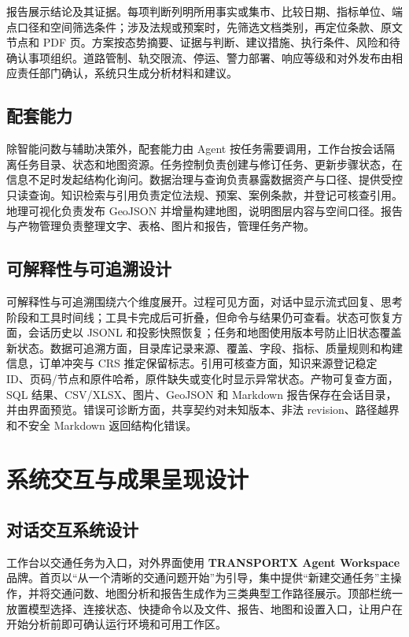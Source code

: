 \documentclass[a4paper,11pt]{article}
\newcommand{\term}[1]{\textbf{#1}}
\begin{document}
报告展示结论及其证据。每项判断列明所用事实或集市、比较日期、指标单位、端点口径和空间筛选条件；涉及法规或预案时，先筛选文档类别，再定位条款、原文节点和 PDF 页。方案按态势摘要、证据与判断、建议措施、执行条件、风险和待确认事项组织。道路管制、轨交限流、停运、警力部署、响应等级和对外发布由相应责任部门确认，系统只生成分析材料和建议。

\subsection{配套能力}

除智能问数与辅助决策外，配套能力由 Agent 按任务需要调用，工作台按会话隔离任务目录、状态和地图资源。任务控制负责创建与修订任务、更新步骤状态，在信息不足时发起结构化询问。数据治理与查询负责暴露数据资产与口径、提供受控只读查询。知识检索与引用负责定位法规、预案、案例条款，并登记可核查引用。地理可视化负责发布 GeoJSON 并增量构建地图，说明图层内容与空间口径。报告与产物管理负责整理文字、表格、图片和报告，管理任务产物。

\subsection{可解释性与可追溯设计}

可解释性与可追溯围绕六个维度展开。过程可见方面，对话中显示流式回复、思考阶段和工具时间线；工具卡完成后可折叠，但命令与结果仍可查看。状态可恢复方面，会话历史以 JSONL 和投影快照恢复；任务和地图使用版本号防止旧状态覆盖新状态。数据可追溯方面，目录库记录来源、覆盖、字段、指标、质量规则和构建信息，订单冲突与 CRS 推定保留标志。引用可核查方面，知识来源登记稳定 ID、页码/节点和原件哈希，原件缺失或变化时显示异常状态。产物可复查方面，SQL 结果、CSV/XLSX、图片、GeoJSON 和 Markdown 报告保存在会话目录，并由界面预览。错误可诊断方面，共享契约对未知版本、非法 revision、路径越界和不安全 Markdown 返回结构化错误。

\newpage
\section{系统交互与成果呈现设计}

\subsection{对话交互系统设计}

工作台以交通任务为入口，对外界面使用 \term{TRANSPORTX Agent Workspace} 品牌。首页以``从一个清晰的交通问题开始''为引导，集中提供``新建交通任务''主操作，并将交通问数、地图分析和报告生成作为三类典型工作路径展示。顶部栏统一放置模型选择、连接状态、快捷命令以及文件、报告、地图和设置入口，让用户在开始分析前即可确认运行环境和可用工作区。
\end{document}
